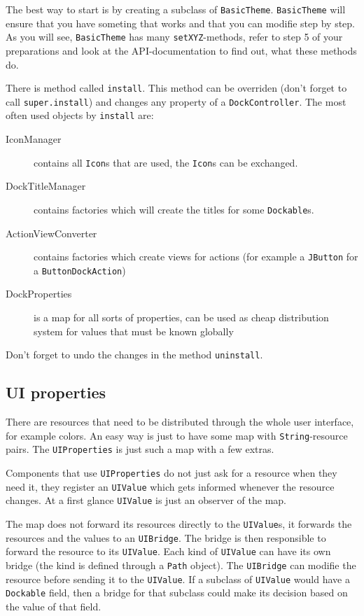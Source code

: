 \documentclass[a4paper,10pt]{article}
\newcommand{\src}[1]{\lstinline[basicstyle=\normalsize\ttfamily,keywordstyle=\normalsize\ttfamily,identifierstyle=\normalsize\ttfamily]|#1|}
\begin{document}
The best way to start is by creating a subclass of \src{BasicTheme}. \src{BasicTheme} will ensure that you have someting that works and that you can modifie step by step. As you will see, \src{BasicTheme} has many \src{setXYZ}-methods, refer to step 5 of your preparations and look at the API-documentation to find out, what these methods do.

There is method called \src{install}. This method can be overriden (don't forget to call \src{super.install}) and changes any property of a \src{DockController}. The most often used objects by \src{install} are:
\begin{description}
 \item[IconManager] contains all \src{Icon}s that are used, the \src{Icon}s can be exchanged.
 \item[DockTitleManager] contains factories which will create the titles for some \src{Dockable}s.
 \item[ActionViewConverter] contains factories which create views for actions (for example a \src{JButton} for a \src{ButtonDockAction})
 \item[DockProperties] is a map for all sorts of properties, can be used as cheap distribution system for values that must be known globally
\end{description}

Don't forget to undo the changes in the method \src{uninstall}.

\subsection{UI properties}
There are resources that need to be distributed through the whole user interface, for example colors. An easy way is just to have some map with \src{String}-resource pairs. The \src{UIProperties} is just such a map with a few extras.

Components that use \src{UIProperties} do not just ask for a resource when they need it, they register an \src{UIValue} which gets informed whenever the resource changes. At a first glance \src{UIValue} is just an observer of the map.

The map does not forward its resources directly to the \src{UIValue}s, it forwards the resources and the values to an \src{UIBridge}. The bridge is then responsible to forward the resource to its \src{UIValue}. Each kind of \src{UIValue} can have its own bridge (the kind is defined through a \src{Path} object). The \src{UIBridge} can modifie the resource before sending it to the \src{UIValue}. If a subclass of \src{UIValue} would have a \src{Dockable} field, then a bridge for that subclass could make its decision based on the value of that field.
\end{document}
